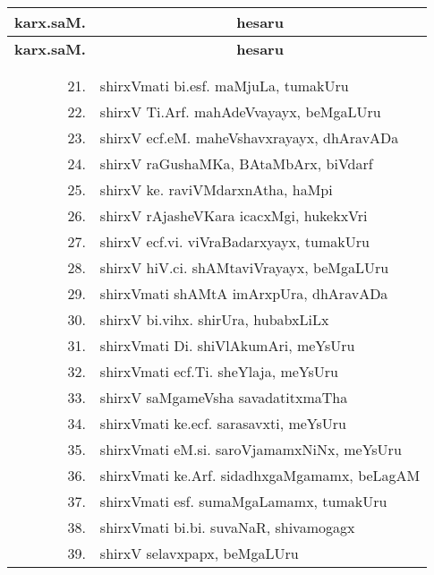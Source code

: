 \begin{center}
\begin{minipage}[t]{7cm}
{\begin{longtable}{rl}
\end{longtable}}
\end{minipage}
\qquad\quad
\begin{minipage}[t]{7cm}
{\renewcommand{\arraystretch}{1.5}
\begin{longtable}{rl}
\hline
{\bf karx.saM.} & \multicolumn{1}{c}{\bf hesaru}\\[3pt]
\hline
\endfirsthead
\hline
{\bf karx.saM.} & \multicolumn{1}{c}{\bf hesaru}\\[3pt]
\hline
  & \\[-10pt]
\endhead
\endfoot
\endlastfoot
  & \\[-10pt]
21. & shirxVmati bi.esf. maMjuLa, tumakUru\\
22. & shirxV Ti.Arf. mahAdeVvayayx, beMgaLUru\\
23. & shirxV ecf.eM. maheVshavxrayayx, dhAravADa\\
24. & shirxV raGushaMKa, BAtaMbArx, biVdarf\\
25. & shirxV ke. raviVMdarxnAtha, haMpi\\
26. & shirxV rAjasheVKara icacxMgi, hukekxVri\\
27. & shirxV ecf.vi. viVraBadarxyayx, tumakUru\\
28. & shirxV hiV.ci. shAMtaviVrayayx, beMgaLUru\\
29. & shirxVmati shAMtA imArxpUra, dhAravADa\\
30. & shirxV bi.vihx. shirUra, hubabxLiLx\\
31. & shirxVmati Di. shiVlAkumAri, meYsUru\\
32. & shirxVmati ecf.Ti. sheYlaja, meYsUru\\
33. & shirxV saMgameVsha savadatitxmaTha\\
34. & shirxVmati ke.ecf. sarasavxti, meYsUru\\
35. & shirxVmati eM.si. saroVjamamxNiNx, meYsUru\\
36. & shirxVmati ke.Arf. sidadhxgaMgamamx, beLagAM\\
37. & shirxVmati esf. sumaMgaLamamx, tumakUru\\
38. & shirxVmati bi.bi. suvaNaR, shivamogagx\\
39. &  shirxV selavxpapx, beMgaLUru\\
\end{longtable}}
\end{minipage}
\end{center}
